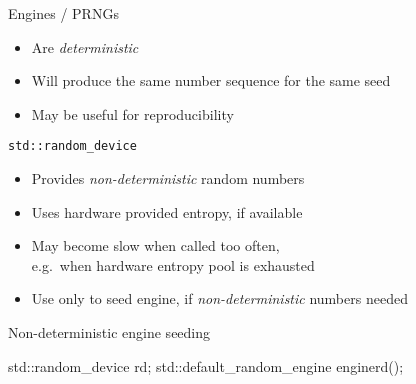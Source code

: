 \begin{frame}[fragile]
  \begin{block}{Engines / PRNGs}
    \begin{itemize}
      \item Are \emph{deterministic}
      \item Will produce the same number sequence for the same seed
      \item May be useful for reproducibility
    \end{itemize}
  \end{block}
  \begin{block}{\texttt{std::random\_device}}
    \begin{itemize}
      \item Provides \emph{non-deterministic} random numbers
      \item Uses hardware provided entropy, if available
      \item May become slow when called too often,\\e.g.\ when hardware entropy pool is exhausted
      \item Use only to seed engine, if \emph{non-deterministic} numbers needed
    \end{itemize}
  \end{block}
  \begin{exampleblock}{Non-deterministic engine seeding}
    \begin{cppcode}
      std::random_device rd;
      std::default_random_engine engine{rd()};
    \end{cppcode}
  \end{exampleblock}
\end{frame}

